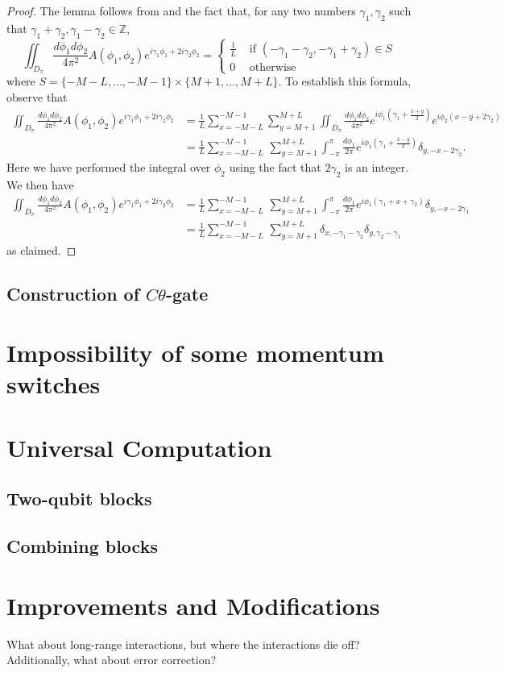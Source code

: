 \documentclass[../thesis-main/thesis-main]{subfiles}
\begin{document}
\begin{proof}
The lemma follows from  and the fact that, for any two numbers $\gamma_{1},\gamma_{2}$ such that $\gamma_{1}+\gamma_{2},\gamma_{1}-\gamma_{2}\in \mathbb{Z}$,
\[
\iint_{D_\pi}\frac{d\phi_{1} d\phi_{2}}{4\pi^2} A(\phi_{1},\phi_{2})e^{i\gamma_{1}\phi_{1}+2i \gamma_{2}\phi_{2}}=\begin{cases}
\frac{1}{L} &\text{ if }(-\gamma_{1}-\gamma_{2},-\gamma_{1}+\gamma_{2})\in S \\
0 &\text{ otherwise}
\end{cases}
\]
where $S = \{-M-L,\ldots, -M-1\} \times \{M+1,\ldots, M+L\}$.  To establish this formula, observe that
\begin{align*}
  \iint_{D_{\pi}}\frac{d\phi_1 d\phi_{2}}{4\pi^2}A(\phi_{1},\phi_{2})e^{ i\gamma_{1}\phi_{1}+2i\gamma_{2}\phi_{2}} 
  	& =  \frac{1}{L}\sum_{x=-M-L}^{-M-1}\sum_{y=M+1}^{M+L}\iint_{D_{\pi}}\frac{d\phi_1 d\phi_{2}}{4\pi^2}
  		e^{i\phi_{1}\left(\gamma_{1}+\frac{x+y}{2}\right)}e^{i\phi_{2}\left(x-y+2\gamma_{2}\right)}\\
 & =  \frac{1}{L}\sum_{x=-M-L}^{-M-1}\,\sum_{y=M+1}^{M+L}\int_{-\pi}^{\pi}\frac{d\phi_{1}}{2\pi}
 	e^{i\phi_{1}\left(\gamma_{1}+\frac{x-y}{2}\right)}\delta_{y,-x-2\gamma_{2}}.
\end{align*}
 Here we have performed the integral over $\phi_{2}$ using the fact
that $2\gamma_{2}$ is an integer.  We then have
\begin{align*}
\iint_{D_\pi}\frac{d\phi_{1} d\phi_{2}}{4\pi^2} A(\phi_{1},
	\phi_{2})e^{i\gamma_{1}\phi_{1}+2i\gamma_{2}\phi_{2}} 
 & =  \frac{1}{L}\sum_{x=-M-L}^{-M-1}\,
	\sum_{y=M+1}^{M+L}\int_{-\pi}^{\pi}\frac{d\phi_{1}}{2\pi}e^{i\phi_{1}
	\left(\gamma_{1}+x+\gamma_{2}\right)}\delta_{y,-x-2\gamma_{1}}\\
 & =  \frac{1}{L}\sum_{x=-M-L}^{-M-1}\,\sum_{y=M+1}^{M+L}\delta_{x,-\gamma_{1}-\gamma_{2}}\delta_{y,\gamma_{2}-\gamma_{1}}
 \end{align*}
as claimed.
\end{proof}

\subsection{Construction of $C\theta$-gate}

\section{Impossibility of some momentum switches}

\section{Universal Computation}
\subsection{Two-qubit blocks}
\subsection{Combining blocks}


\section{Improvements and Modifications}

What about long-range interactions, but where the interactions die off?
Additionally, what about error correction?
\end{document}
